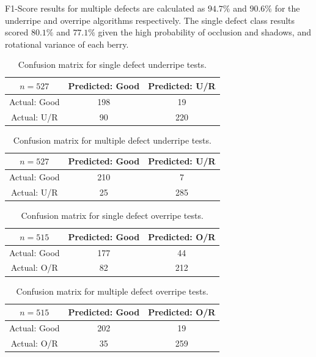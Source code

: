 \documentclass[fleqn,twoside,12pt]{report}
\begin{document}
F1-Score results for multiple defects are calculated as $94.7\%$ and $90.6\%$ for the underripe and overripe algorithms respectively. The single defect class results scored $80.1\%$ and $77.1\%$ given the high probability of occlusion and shadows, and rotational variance of each berry.


\begin{table}
	\centering
	\caption{Confusion matrix for single defect underripe tests.}
	\label{tab:confusion_1}
	\begin{tabular}{ccc}
		\toprule
		$n=527$ & Predicted: Good & Predicted: U/R  \\ 
		\midrule
		Actual: Good   & 198 & 19    \\[6pt] 
		Actual: U/R	   & 90  & 220  \\[6pt] 
		\bottomrule
	\end{tabular}
\end{table}

\begin{table}
	\centering
	\caption{Confusion matrix for multiple defect underripe tests.}
	\label{tab:confusion_2}
	\begin{tabular}{ccc}
		\toprule
		$n=527$ & Predicted: Good & Predicted: U/R  \\ 
		\midrule
		Actual: Good   & 210 & 7    \\[6pt] 
		Actual: U/R	   & 25  & 285  \\[6pt] 
		\bottomrule
	\end{tabular}
\end{table}

\begin{table}
	\centering
	\caption{Confusion matrix for single defect overripe tests.}
	\label{tab:confusion_3}
	\begin{tabular}{ccc}
		\toprule
		$n=515$ & Predicted: Good & Predicted: O/R  \\ 
		\midrule
		Actual: Good   & 177 & 44    \\[6pt] 
		Actual: O/R	   & 82  & 212  \\[6pt] 
		\bottomrule
	\end{tabular}
\end{table}

\begin{table}
	\centering
	\caption{Confusion matrix for multiple defect overripe tests.}
	\label{tab:confusion_4}
	\begin{tabular}{ccc}
		\toprule
		$n=515$ & Predicted: Good & Predicted: O/R  \\ 
		\midrule
		Actual: Good   & 202 & 19    \\[6pt] 
		Actual: O/R	   & 35  & 259  \\[6pt] 
		\bottomrule
	\end{tabular}
\end{table}
\end{document}
